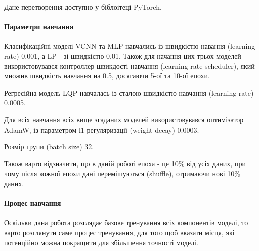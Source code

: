 \documentclass{udstu}
\begin{document}
Дане перетворення доступно у біблоітеці PyTorch.


\paragraph{\textbf{Параметри навчання}\\}

Класифікаційні моделі VCNN та MLP навчались із
швидкістю навання (learning rate) 0.001, а LP - зі швидкістю 0.01.
Також для начання цих трьох моделей використовувався контроллер швикдості навчання
(learning rate scheduler), який множив швидкість навчання на 0.5, досягаючи
5-ої та 10-ої епохи.

Регресійна модель LQP навчалась із сталою швидкістю навчання (learning rate) 0.0005.

Для всіх навчання всіх вище згаданих моделей використовувався оптимізатор
AdamW, із параметром l1 регуляризації (weight decay) 0.0003.

Розмір групи (batch size) 32.

Також варто відзначити, що в даній роботі епоха - це 10\% від усіх даних,
при чому після кожної епохи дані перемішуються (shuffle), отримаючи
нові 10\% даних.


\paragraph{\textbf{Процес навчання}\\}

Оскільки дана робота розглядає базове тренування всіх компонентів моделі,
то варто розглянути саме процес тренування, для того щоб вказати місця, які
потенційно можна покращити для збільшення точності моделі.
\end{document}
